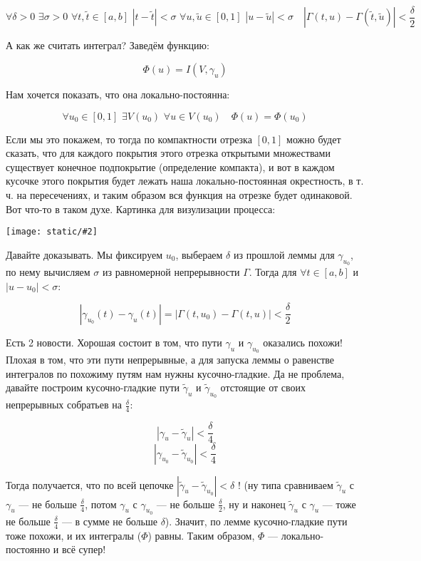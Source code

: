 \documentclass{article}
\def\dbl{\,\,}
\def\images#1#2{\begin{center}\texttt{[image: static/\#2]}\end{center}}
\begin{document}
\[\forall \delta > 0 \dbl \exists \sigma > 0 \dbl \forall t, \tilde{t} \in [a, b] \dbl |t - \tilde{t}| < \sigma \dbl \forall u, \tilde{u} \in [0, 1] \dbl |u - \tilde{u}| < \sigma \quad |\Gamma(t, u) - \Gamma(\tilde{t}, \tilde{u})| < \frac{\delta}{2}\]

А как же считать интеграл? Заведём функцию:

\[\Phi(u) = I(V, \gamma_u)\]

Нам хочется показать, что она локально-постоянна:

\[\forall u_0 \in [0, 1] \dbl \exists V(u_0) \dbl \forall u \in V(u_0) \quad \Phi(u) = \Phi(u_0)\]

Если мы это покажем, то тогда по компактности отрезка $[0, 1]$ можно будет сказать, что для каждого покрытия этого отрезка открытыми множествами существует конечное подпокрытие (определение компакта), и вот в каждом кусочке этого покрытия будет лежать наша локально-постоянная окрестность, в т. ч. на пересечениях, и таким образом вся функция на отрезке будет одинаковой. Вот что-то в таком духе. Картинка для визулизации процесса:

\images{0.3}{rav_gomotop_put.jpg}

Давайте доказывать. Мы фиксируем $u_0$, выбераем $\delta$ из прошлой леммы для $\gamma_{u_0}$, по нему вычисляем $\sigma$ из равномерной непрерывности $\Gamma$. Тогда для $\forall t \in [a, b]$ и $|u - u_0| < \sigma$:

\[|\gamma_{u_0}(t) - \gamma_{u}(t)| = |\Gamma(t, u_0) - \Gamma(t, u)| < \frac{\delta}{2}\]

Есть 2 новости. Хорошая состоит в том, что пути $\gamma_{u}$ и $\gamma_{u_0}$ оказались похожи! Плохая в том, что эти пути непрерывные, а для запуска леммы о равенстве интегралов по похожиму путям нам нужны кусочно-гладкие. Да не проблема, давайте построим кусочно-гладкие пути $\tilde{\gamma}_{u}$ и $\tilde{\gamma}_{u_0}$ отстоящие от своих непрерывных собратьев на $\frac{\delta}{4}$:

\[|\gamma_{u} - \tilde{\gamma}_{u}| < \frac{\delta}{4}\]
\[|\gamma_{u_0} - \tilde{\gamma}_{u_0}| < \frac{\delta}{4}\]

Тогда получается, что по всей цепочке $|\tilde{\gamma}_{u} - \tilde{\gamma}_{u_0}| < \delta$ ! (ну типа сравниваем $\tilde{\gamma}_{u}$ с $\gamma_{u}$ --- не больше $\frac{\delta}{4}$, потом $\gamma_{u}$ с $\gamma_{u_{0}}$ --- не больше $\frac{\delta}{2}$, ну и наконец $\tilde{\gamma}_{u}$ с $\gamma_{u}$ --- тоже не больше $\frac{\delta}{4}$ --- в сумме не больше $\delta$). Значит, по лемме кусочно-гладкие пути тоже похожи, и их интегралы ($\Phi$) равны. Таким образом, $\Phi$ --- локально-постоянно и всё супер!
\end{document}
